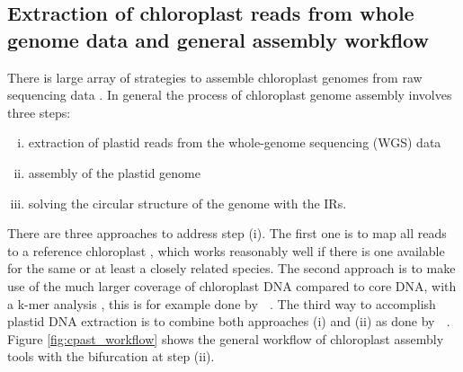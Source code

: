 \subsection{Extraction of chloroplast reads from whole genome data and general assembly workflow}
There is large array of strategies to assemble chloroplast genomes from raw sequencing
data \cite{twyford_strategies_2017}. In general the process of chloroplast genome assembly
involves three steps:
\begin{enumerate}[(i)]
\item extraction of plastid reads from the whole-genome sequencing (WGS) data
\item assembly of the plastid genome
\item solving the circular structure of
the genome with the IRs.
\end{enumerate}
There are three approaches to address step (i). The first one is to map all reads to a
reference chloroplast \cite{Vinga2012}, which works reasonably well if there is one
available for the same or at least a closely related species. The second approach is to
make use of the much larger coverage of chloroplast DNA compared to core DNA, with a k-mer
analysis \cite{Chan2013}, this is for example done by \ce $\;$
\cite{j_ankenbrand_chloroextractor:_2018}. The third way to accomplish plastid DNA
extraction is to combine both approaches (i) and (ii) as done by \np $\;$
\cite{dierckxsens_novoplasty:_2017}. Figure \ref{fig:cpast_workflow} shows the general
workflow of chloroplast assembly tools with the bifurcation at step (ii).

